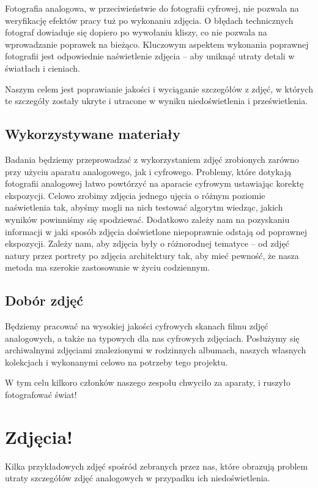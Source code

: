 \documentclass[]{mwart}
\begin{document}
Fotografia analogowa, w przeciwieństwie do fotografii cyfrowej,
nie pozwala na weryfikację efektów pracy tuż po wykonaniu zdjęcia.
O błędach technicznych fotograf dowiaduje się dopiero po wywołaniu
kliszy, co nie pozwala na wprowadzanie poprawek na bieżąco.
Kluczowym aspektem wykonania poprawnej fotografii jest odpowiednie
naświetlenie zdjęcia -- aby uniknąć utraty detali w światłach i cieniach.

Naszym celem jest poprawianie jakości i wyciąganie szczegółów
z zdjęć, w których te szczegóły zostały ukryte i utracone w wyniku
niedoświetlenia i prześwietlenia.

\subsection{Wykorzystywane materiały}
Badania będziemy przeprowadzać z wykorzystaniem zdjęć zrobionych
zarówno przy użyciu aparatu analogowego, jak i cyfrowego. Problemy,
które dotykają fotografii analogowej łatwo powtórzyć na aparacie cyfrowym
ustawiając korektę ekspozycji.
Celowo zrobimy zdjęcia jednego ujęcia o różnym poziomie naświetlenia tak,
abyśmy mogli na nich testować algorytm wiedząc, jakich wyników powinniśmy
się spodziewać. Dodatkowo zależy nam na pozyskaniu informacji w jaki sposób zdjęcia doświetlone niepoprawnie odstają od poprawnej ekspozycji.
Zależy nam, aby zdjęcia były o różnorodnej tematyce -- od zdjęć
natury przez portrety po zdjęcia architektury tak, aby mieć pewność, że nasza
metoda ma szerokie zastosowanie w życiu codziennym.


\subsection{Dobór zdjęć}
Będziemy pracować na wysokiej jakości cyfrowych skanach filmu zdjęć
analogowych, a także na typowych dla nas cyfrowych zdjęciach.
Posłużymy się archiwalnymi zdjęciami znalezionymi w
rodzinnych albumach, naszych własnych kolekcjach i wykonanymi
celowo na potrzeby tego projektu.

W tym celu kilkoro członków naszego zespołu chwyciło
za aparaty, i ruszyło fotografować świat!

\newpage
\section{Zdjęcia!}
Kilka przykładowych zdjęć spośród zebranych przez nas, które obrazują problem
utraty szczegółów zdjęć analogowych w przypadku ich niedoświetlenia. \newline
\end{document}

